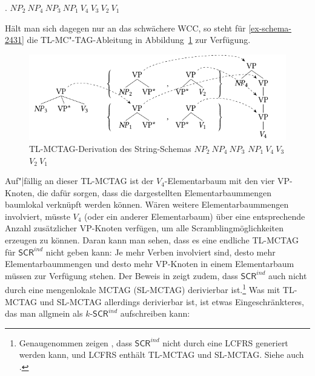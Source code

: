 \ex. $\mathit{NP}_2 ~ \mathit{NP}_4 ~ \mathit{NP}_3 ~ \mathit{NP}_1 ~ V_4 ~ V_3 ~ V_2 ~ V_1$\label{ex-schema-2431}

Hält man sich dagegen nur an das schwächere WCC, so steht für \ref{ex-schema-2431} die TL-MC"-TAG-Ableitung in Abbildung~\ref{fig-schema-2431} zur Verfügung.
\begin{figure}[t]
\centering
\includegraphics{graphics/abb516.pdf}
\caption{\label{fig-schema-2431}TL-MCTAG-Derivation des String-Schemas $\mathit{NP}_2 ~ \mathit{NP}_4 ~ \mathit{NP}_3$ $\mathit{NP}_1 ~ V_4 ~ V_3$ $V_2 ~ V_1$}
\end{figure}
Auf"|fällig an dieser TL-MCTAG ist der $V_4$-Ele\-men\-tarbaum mit den vier VP-Knoten, die dafür sorgen, dass die dargestellten Elementarbaummengen baumlokal verknüpft werden können. Wären weitere Elementarbaummengen involviert, müsste $V_4$ (oder ein anderer Elementarbaum) über eine entsprechende Anzahl zusätzlicher VP-Knoten verfügen, um alle Scramblingmöglichkeiten erzeugen zu können. Daran kann man sehen, dass es eine endliche TL-MCTAG für $\mathsf{SCR}^{ind}$ nicht geben kann: Je mehr Verben involviert sind, desto mehr Elementarbaummengen und desto mehr VP-Knoten in einem Elementarbaum müssen zur Verfügung stehen. Der Beweis in \cite{Becker:Rambow:Niv:92} zeigt zudem, dass $\mathsf{SCR}^{ind}$ auch nicht durch eine mengenlokale MCTAG (SL-MCTAG) derivierbar ist.\footnote{\label{fn-lcfrs} Genaugenommen zeigen \cite{Becker:Rambow:Niv:92}, dass $\mathsf{SCR}^{ind}$ nicht durch eine LCFRS generiert werden kann, und LCFRS enthält TL-MCTAG und SL-MCTAG. Siehe auch \citet[53ff]{Rambow:94}.} Was mit TL-MCTAG und SL-MCTAG allerdings derivierbar ist, ist etwas Eingeschränkteres, das man allgmein als $k$-$\mathsf{SCR}^{ind}$ aufschreiben kann:

